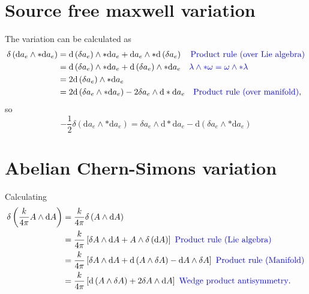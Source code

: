 \documentclass{article}
\begin{document}
\section{Source free maxwell variation}
\label{appendixsourcefreemaxwell}
The variation can be calculated as
\begin{align}
    \delta\left(\mathrm{d}a_{e} \wedge * \mathrm{d}a_{e}\right) &= \mathrm{d}\left(\delta a_{e} \right)\wedge * \mathrm{d}a_{e} + \mathrm{d}a_{e}\wedge * \mathrm{d}\left(\delta a_{e} \right) \nonumber \color{blue}\quad \text{Product rule (over Lie algebra)} \color{black} \\
    &= \mathrm{d}\left(\delta a_{e} \right)\wedge * \mathrm{d}a_{e} + \mathrm{d}\left(\delta a_{e} \right)\wedge *\mathrm{d}a_{e}\nonumber\color{blue}\quad \lambda\wedge * \omega  = \omega \wedge * \lambda\color{black}\\
    &= 2\mathrm{d}\left(\delta a_{e}\right)\wedge * \mathrm{d}a_{e}\nonumber \\
    &= 2\mathrm{d}\left(\delta a_{e}\wedge * \mathrm{d}a_{e} \right) - 2 \delta a_{e}\wedge \mathrm{d}*\mathrm{d}a_{e}\nonumber\quad \color{blue} \text{Product rule (over manifold)} \color{black},
\end{align}
so
\begin{equation}
    \boxed{
    -\frac{1}{2}\delta\left(\mathrm{d}a_{e} \wedge * \mathrm{d}a_{e}\right) = \delta a_{e}\wedge \mathrm{d}*\mathrm{d}a_{e} - \mathrm{d}\left(\delta a_{e}\wedge *\mathrm{d}a_{e} \right)
    }
\end{equation}


\section{Abelian Chern-Simons variation}
\label{appendixabelianchernsimonsvariation}
Calculating
\begin{align}
    \delta\left(\frac{k}{4\pi}A\wedge \mathrm{d} A \right) &= \frac{k}{4\pi}\delta\left(A\wedge \mathrm{d}A\right)\nonumber\\
    &= \frac{k}{4\pi}\left[\delta A \wedge \mathrm{d}A + A\wedge \delta\left(\mathrm{d}A\right)\right]\color{blue}\text{ Product rule (Lie algebra)}\color{black}\nonumber\\
    &= \frac{k}{4\pi}\left[\delta A \wedge \mathrm{d}A + \mathrm{d}\left(A\wedge \delta A\right)-\mathrm{d}A\wedge \delta A\right]\color{blue}\text{ Product rule (Manifold)}\color{black}\nonumber\\
    &= \frac{k}{4\pi}\left[\mathrm{d}\left(A\wedge \delta A \right) + 2\delta A \wedge \mathrm{d}A\right] \color{blue}\text{ Wedge product antisymmetry}\color{black}.\nonumber 
\end{align}
\end{document}

